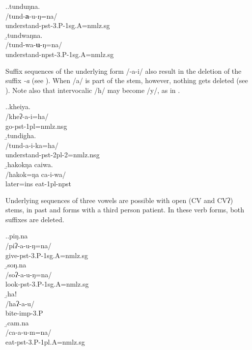 \ex.\a.\glll tunduŋna.\\
/tund-\textbf{a}-u-ŋ=na/\\
understand{\sc -pst-3.P-1sg.A=nmlz.sg}\\
\b.\glll  tundwaŋna.\\
/tund-wa-\textbf{u}-ŋ=na/\\
understand{\sc -npst-3.P-1sg.A=nmlz.sg}\\


Suffix sequences of the underlying form /-a-i/ also result in the deletion of the suffix \emph{-a} (see \Next). When /a/ is part of the stem, however, nothing gets deleted (see \Next[c]).  Note also that intervocalic /h/ may become /y/, as in \Next[a].

\ex.\a.\glll kheiya.\\
/kheʔ-a-i=ha/\\
go{\sc -pst-1pl=nmlz.nsg}\\
\b.\glll  tundigha.\\
/tund-a-i-ka=ha/\\
understand{\sc [3.A]-pst-2pl-2=nmlz.nsg}\\
\b.\glll hakokŋa caiwa.\\
/hakok=ŋa ca-i-wa/\\
later{\sc =ins} eat{\sc -1pl-npst}\\

Underlying sequences of three vowels are possible with open (CV and CVʔ) stems, in past and  forms with a third person patient. In these verb forms, both suffixes are deleted. 

\ex.\a.\glll piŋ.na\\
/piʔ-a-u-ŋ=na/\\
give{\sc -pst-3.P-1sg.A=nmlz.sg}\\
\b.\glll  soŋ.na\\
/soʔ-a-u-ŋ=na/\\
look{\sc -pst-3.P-1sg.A=nmlz.sg}\\
\b.\glll  haǃ\\
/haʔ-a-u/\\
bite{\sc -imp-3.P}\\
\b.\glll  cam.na\\
/ca-a-u-m=na/\\
eat{\sc -pst-3.P-1pl.A=nmlz.sg}\\


